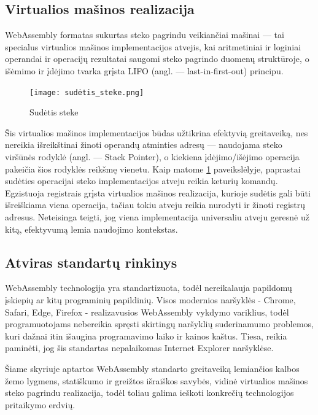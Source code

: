 \documentclass{VUMIFPSkursinis}
\begin{document}
\subsection{Virtualios mašinos realizacija}

WebAssembly formatas sukurtas steko pagrindu veikiančiai mašinai — tai specialus virtualios mašinos implementacijos atvejis, kai aritmetiniai ir loginiai operandai ir operacijų rezultatai saugomi steko pagrindo duomenų struktūroje, o išėmimo ir įdėjimo tvarka grįsta LIFO (angl. — last-in-first-out) principu. 

\begin{figure}[h!]
  \begin{center}
  \texttt{[image: sudėtis\_steke.png]}
  \end{center}
  \caption{Sudėtis steke}
  \label{fig:stack_addition}
\end{figure}

Šis virtualios mašinos implementacijos būdas užtikrina efektyvią greitaveiką, nes nereikia išreikštinai žinoti operandų atminties adresų — naudojama steko viršūnės rodyklė (angl. — Stack Pointer), o kiekiena įdėjimo/išėjimo operacija pakeičia šios rodyklės reikšmę vienetu.
Kaip matome \ref{fig:stack_addition} paveikslėlyje, paprastai sudėties operacijai steko implementacijos atveju reikia keturių komandų. Egzistuoja registrais grįsta virtualios mašinos realizacija, kurioje sudėtis gali būti išreiškiama viena operacija, tačiau tokiu atveju reikia nurodyti ir žinoti registrų adresus. \cite{Sin12} Neteisinga teigti, jog viena implementacija universaliu atveju geresnė už kitą, efektyvumą lemia naudojimo kontekstas.

\subsection{Atviras standartų rinkinys}
WebAssembly technologija yra standartizuota, todėl nereikalauja papildomų įskiepių ar kitų programinių papildinių. Visos modernios naršyklės - Chrome, Safari, Edge, Firefox - realizavusios WebAssembly vykdymo variklius, todėl programuotojams nebereikia spręsti skirtingų naršyklių suderinamumo problemos, kuri dažnai itin išaugina programavimo laiko ir kainos kaštus. Tiesa, reikia paminėti, jog šis standartas nepalaikomas Internet Explorer naršyklėse. 

Šiame skyriuje aptartos WebAssembly standarto greitaveiką lemiančios kalbos žemo lygmens, statiškumo ir greižtos išraiškos savybės, vidinė virtualios mašinos steko pagrindu realizacija, todėl toliau galima ieškoti konkrečių technologijos pritaikymo erdvių.
\end{document}
